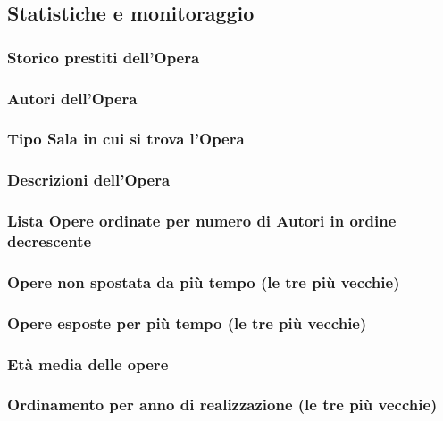 \subsection{Statistiche e monitoraggio}

\subsubsection{Storico prestiti dell’Opera}
\subsubsection{Autori dell’Opera}
\subsubsection{Tipo Sala in cui si trova l’Opera}
\subsubsection{Descrizioni dell’Opera}
\subsubsection{Lista Opere ordinate per numero di Autori in ordine decrescente}
\subsubsection{Opere non spostata da più tempo (le tre più vecchie)}
\subsubsection{Opere esposte per più tempo (le tre più vecchie)}
\subsubsection{Età media delle opere}
\subsubsection{Ordinamento per anno di realizzazione (le tre più vecchie)}
